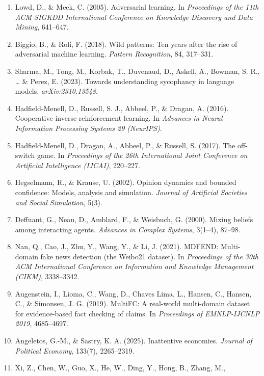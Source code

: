 \documentclass[
  11pt]{article}
\begin{document}
\begin{enumerate}
  Adversarial classification. In \emph{Proceedings of the 10th ACM
  SIGKDD International Conference on Knowledge Discovery and Data
  Mining}, 99--108.
\item
  Lowd, D., \& Meek, C. (2005). Adversarial learning. In
  \emph{Proceedings of the 11th ACM SIGKDD International Conference on
  Knowledge Discovery and Data Mining}, 641--647.
\item
  Biggio, B., \& Roli, F. (2018). Wild patterns: Ten years after the
  rise of adversarial machine learning. \emph{Pattern Recognition}, 84,
  317--331.
\item
  Sharma, M., Tong, M., Korbak, T., Duvenaud, D., Askell, A., Bowman, S.
  R., \ldots{} \& Perez, E. (2023). Towards understanding sycophancy in
  language models. \emph{arXiv:2310.13548}.
\item
  Hadfield-Menell, D., Russell, S. J., Abbeel, P., \& Dragan, A. (2016).
  Cooperative inverse reinforcement learning. In \emph{Advances in
  Neural Information Processing Systems 29 (NeurIPS)}.
\item
  Hadfield-Menell, D., Dragan, A., Abbeel, P., \& Russell, S. (2017).
  The off-switch game. In \emph{Proceedings of the 26th International
  Joint Conference on Artificial Intelligence (IJCAI)}, 220--227.
\item
  Hegselmann, R., \& Krause, U. (2002). Opinion dynamics and bounded
  confidence: Models, analysis and simulation. \emph{Journal of
  Artificial Societies and Social Simulation}, 5(3).
\item
  Deffuant, G., Neau, D., Amblard, F., \& Weisbuch, G. (2000). Mixing
  beliefs among interacting agents. \emph{Advances in Complex Systems},
  3(1--4), 87--98.
\item
  Nan, Q., Cao, J., Zhu, Y., Wang, Y., \& Li, J. (2021). MDFEND:
  Multi-domain fake news detection (the Weibo21 dataset). In
  \emph{Proceedings of the 30th ACM International Conference on
  Information and Knowledge Management (CIKM)}, 3338--3342.
\item
  Augenstein, I., Lioma, C., Wang, D., Chaves Lima, L., Hansen, C.,
  Hansen, C., \& Simonsen, J. G. (2019). MultiFC: A real-world
  multi-domain dataset for evidence-based fact checking of claims. In
  \emph{Proceedings of EMNLP-IJCNLP 2019}, 4685--4697.
\item
  Angeletos, G.-M., \& Sastry, K. A. (2025). Inattentive economies.
  \emph{Journal of Political Economy}, 133(7), 2265--2319.
\item
  Xi, Z., Chen, W., Guo, X., He, W., Ding, Y., Hong, B., Zhang, M.,

\end{enumerate}
\end{document}

